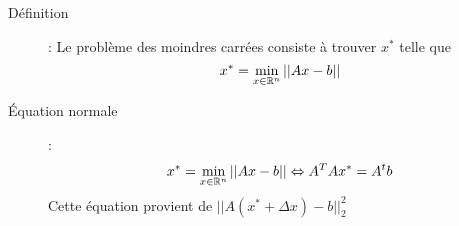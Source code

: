 \begin{description}
\item[Définition] : Le problème des moindres carrées consiste à trouver $x^*$ telle que
    \[
        x^*=\min_{x\in\mathbb{R}^n}||Ax-b||
    \]
\item[Équation normale] :
    \[
        x^*=\min_{x\in\mathbb{R}^n}||Ax-b||
        \Leftrightarrow
        A^TAx^*=A^tb
    \]
    Cette équation provient de $||A(x^*+\Delta x)-b||_2^2$
\end{description}